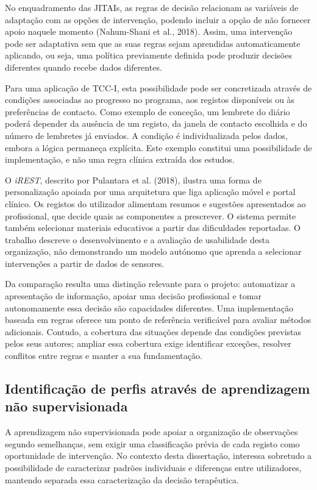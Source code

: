 No enquadramento das JITAIs, as regras de decisão relacionam as variáveis de adaptação com as opções de intervenção, podendo incluir a opção de não fornecer apoio naquele momento (Nahum-Shani et al., 2018). Assim, uma intervenção pode ser adaptativa sem que as suas regras sejam aprendidas automaticamente aplicando, ou seja, uma política previamente definida pode produzir decisões diferentes quando recebe dados diferentes.

Para uma aplicação de TCC-I, esta possibilidade pode ser concretizada através de condições associadas ao progresso no programa, aos registos disponíveis ou às preferências de contacto. Como exemplo de conceção, um lembrete do diário poderá depender da ausência de um registo, da janela de contacto escolhida e do número de lembretes já enviados. A condição é individualizada pelos dados, embora a lógica permaneça explícita. Este exemplo constitui uma possibilidade de implementação, e não uma regra clínica extraída dos estudos.

O \textit{iREST}, descrito por Pulantara et al. (2018), ilustra uma forma de personalização apoiada por uma arquitetura que liga aplicação móvel e portal clínico. Os registos do utilizador alimentam resumos e sugestões apresentados ao profissional, que decide quais as componentes a prescrever. O sistema permite também selecionar materiais educativos a partir das dificuldades reportadas. O trabalho descreve o desenvolvimento e a avaliação de usabilidade desta organização, não demonstrando um modelo autónomo que aprenda a selecionar intervenções a partir de dados de sensores.

Da comparação resulta uma distinção relevante para o projeto: automatizar a apresentação de informação, apoiar uma decisão profissional e tomar autonomamente essa decisão são capacidades diferentes. Uma implementação baseada em regras oferece um ponto de referência verificável para avaliar métodos adicionais. Contudo, a cobertura das situações depende das condições previstas pelos seus autores; ampliar essa cobertura exige identificar exceções, resolver conflitos entre regras e manter a sua fundamentação.

\subsection{Identificação de perfis através de aprendizagem não supervisionada}
\label{sec:chap3_sleepProfiles}

A aprendizagem não supervisionada pode apoiar a organização de observações segundo semelhanças, sem exigir uma classificação prévia de cada registo como oportunidade de intervenção. No contexto desta dissertação, interessa sobretudo a possibilidade de caracterizar padrões individuais e diferenças entre utilizadores, mantendo separada essa caracterização da decisão terapêutica.

